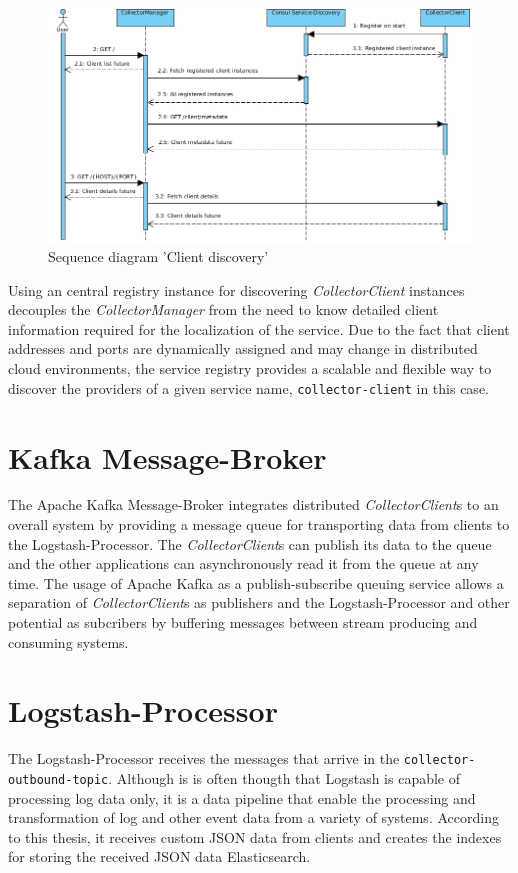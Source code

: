 \begin{figure}[H]
	\centering
	\includegraphics[width=1.0\textwidth]{../uml/sequence-discovery.jpg}
	\caption{Sequence diagram 'Client discovery'}
	\label{fig:sequence-client-discovery}
\end{figure}

Using an central registry instance for discovering \textit{CollectorClient} instances decouples the \textit{CollectorManager} from the
need to know detailed client information required for the localization of the service. Due to the fact that
client addresses and ports are dynamically assigned and may change in distributed cloud environments, the service registry provides
a scalable and flexible way to discover the providers of a given service name, \verb|collector-client| in this case.

\section{Kafka Message-Broker}

The Apache Kafka Message-Broker integrates distributed \textit{CollectorClient}s to an overall system by providing a
message queue for transporting data from clients to the Logstash-Processor. The \textit{CollectorClient}s can publish
its data to the queue and the other applications can asynchronously read it from the queue at any time.
The usage of Apache Kafka as a publish-subscribe queuing service allows a separation of \textit{CollectorClient}s as publishers and the
Logstash-Processor and other potential as subcribers by buffering messages between stream producing and consuming systems.

\section{Logstash-Processor}
The Logstash-Processor receives the messages that arrive in the \verb|collector-outbound-topic|. Although is is often thougth that
Logstash is capable of processing log data only, it is a data pipeline that enable the processing and transformation of log and other
event data from a variety of systems. According to this thesis, it receives custom JSON data from clients and creates the indexes
for storing the received JSON data Elasticsearch.

